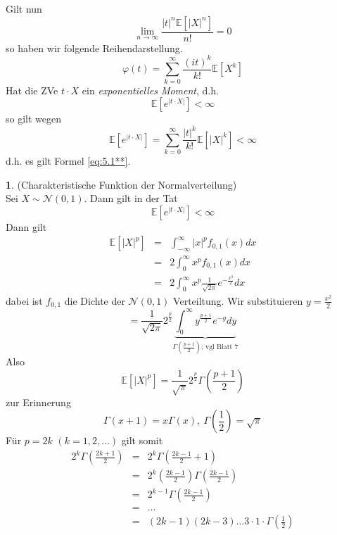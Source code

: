 \documentclass[10pt,a4paper]{report}
\numberwithin{equation}{section}
\numberwithin{figure}{section}
\theoremstyle{plain}
\theoremstyle{definition}
\theoremstyle{plain}
\theoremstyle{definition}
\newtheorem{example}{\protect\examplename}[section]
\theoremstyle{remark}
\theoremstyle{plain}
\theoremstyle{plain}
\theoremstyle{plain}
\theoremstyle{plain}
\theoremstyle{plain}
\providecommand{\examplename}{Beispiel}
\newcommand{\1}{ \mathbb{1} } %
\begin{document}
Gilt nun 
\[
\lim_{n\to\infty}\frac{\left|t\right|^{n}\mathbb{E}\left[\left|X\right|^{n}\right]}{n!}=0
\]
so haben wir folgende Reihendarstellung. 
\begin{equation}
\varphi\left(t\right)=\sum_{k=0}^{\infty}\frac{\left(it\right)^{k}}{k!}\mathbb{E}\left[X^{k}\right]\label{eq:5.1**}
\end{equation}
Hat die ZVe $t\cdot X$ ein \emph{exponentielles
Moment}, d.h. 
\[
\mathbb{E}\left[e^{\left|t\cdot X\right|}\right]<\infty
\]
so gilt wegen 
\[
\mathbb{E}\left[e^{\left|t\cdot X\right|}\right]=\sum_{k=0}^{\infty}\frac{\left|t\right|^{k}}{k!}\mathbb{E}\left[\left|X\right|^{k}\right]<\infty
\]
d.h. es gilt Formel \ref{eq:5.1**}. 
\begin{example}
(Charakteristische Funktion der Normalverteilung)\\
Sei $X\sim\mathcal{N}\left(0,1\right)$. Dann gilt in der Tat
\[
\mathbb{E}\left[e^{\left|t\cdot X\right|}\right]<\infty
\]
Dann gilt 
\begin{eqnarray*}
\mathbb{E}\left[\left|X\right|^{p}\right] & = & \int_{-\infty}^{\infty}\left|x\right|^{p}f_{0,1}\left(x\right)dx\\
 & = & 2\int_{0}^{\infty}x^{p}f_{0,1}\left(x\right)dx\\
 & = & 2\int_{0}^{\infty}x^{p}\frac{1}{\sqrt{2\pi}}e^{-\frac{x^{2}}{2}}dx
\end{eqnarray*}
dabei ist $f_{0,1}$ die Dichte der $\mathcal{N}\left(0,1\right)$
Verteiltung. Wir substituieren $y=\frac{x^{2}}{2}$
\[
=\frac{1}{\sqrt{2\pi}}2^{\frac{p}{2}}\underset{\Gamma\left(\frac{p+1}{2}\right)\mbox{; vgl Blatt 7}}{\underbrace{\int_{0}^{\infty}y^{\frac{p+1}{2}}e^{-y}dy}}
\]
Also 
\[
\mathbb{E}\left[\left|X\right|^{p}\right]=\frac{1}{\sqrt{\pi}}2^{\frac{p}{2}}\Gamma\left(\frac{p+1}{2}\right)
\]
zur Erinnerung
\[
\Gamma\left(x+1\right)=x\Gamma\left(x\right),\ \Gamma\left(\frac{1}{2}\right)=\sqrt{\pi}
\]
Für $p=2k$ $\left(k=1,2,\ldots\right)$ gilt somit 
\begin{eqnarray*}
2^{k}\Gamma\left(\frac{2k+1}{2}\right) & = & 2^{k}\Gamma\left(\frac{2k-1}{2}+1\right)\\
 & = & 2^{k}\left(\frac{2k-1}{2}\right)\Gamma\left(\frac{2k-1}{2}\right)\\
 & = & 2^{k-1}\Gamma\left(\frac{2k-1}{2}\right)\\
 & = & \ldots\\
 & = & \left(2k-1\right)\left(2k-3\right)\ldots3\cdot1\cdot\Gamma\left(\frac{1}{2}\right)
\end{eqnarray*}

\end{example}
\end{document}
